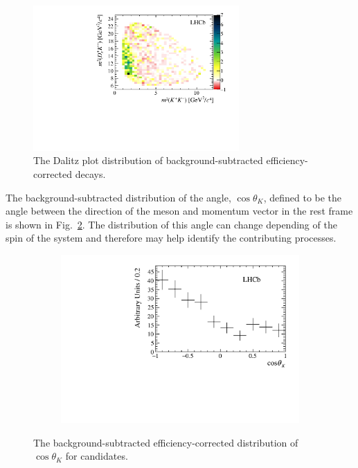 \begin{figure}[!h]
    \centering
    \includegraphics[width=0.7\textwidth]{figs/B2DsKK/Dalitz_plot_sweighted.pdf}
    \caption{The Dalitz plot distribution of background-subtracted efficiency-corrected \decay{\Bp}{\Dsp\Kp\Km} decays.}
    \label{fig:B2DsKK_Dalitzplot}   
\end{figure}



The background-subtracted distribution of the angle, $\cos{\theta_{K}}$, defined to be the angle between the direction of the \Kp meson and \Bp momentum vector in the \Kp\Km rest frame is shown in Fig.~\ref{fig:B2DsKK_helicity_angle}. The distribution of this angle can change depending of the spin of the \Kp\Km system and therefore may help identify the contributing processes. 

\begin{figure}[!h]
    \centering
    \begin{subfigure}[t]{0.59\textwidth}
        \includegraphics[width=1.0\textwidth]{figs/B2DsKK/helAngle_sweighted.pdf}
    \end{subfigure}
    \caption{The background-subtracted efficiency-corrected distribution of $\cos{\theta_{K}}$ for \decay{\Bp}{\Dsp\Kp\Km} candidates.}
    \label{fig:B2DsKK_helicity_angle}
\end{figure}

